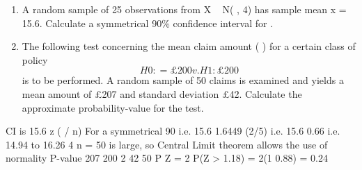 \documentclass[a4paper,12pt]{article}
\begin{document}
\begin{enumerate}
\item A random sample of 25 observations from X ~ N( , 4) has sample mean x = 15.6.
Calculate a symmetrical 90\% confidence interval for . 
\item The following test concerning the mean claim amount ( ) for a certain class of policy
\[H0: = £200 v. H1 : £200\]
is to be performed. A random sample of 50 claims is examined and yields a mean
amount of £207 and standard deviation £42.
Calculate the approximate probability-value for the test. 
\end{enumerate}
 CI is 15.6 {z ( / n)}
For a symmetrical 90%
i.e. 15.6 {1.6449 (2/5)} i.e. 15.6 0.66 i.e. 14.94 to 16.26
4 n = 50 is large, so Central Limit theorem allows the use of normality
P-value
207 200
2
42
50
P Z
= 2 P(Z > 1.18) = 2(1 0.88) = 0.24

\end{document}
